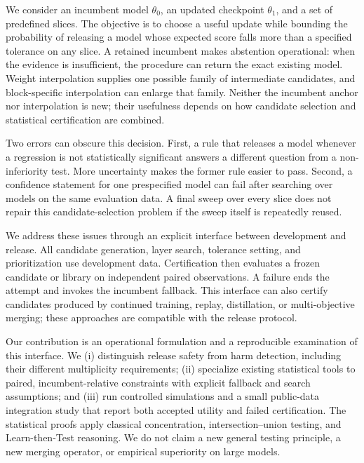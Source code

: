 \documentclass[11pt,letterpaper]{article}
\newcommand{\old}{\theta_0}
\newcommand{\new}{\theta_1}
\begin{document}
We consider an incumbent model $\old$, an updated checkpoint $\new$, and a set of predefined slices. The objective is to choose a useful update while bounding the probability of releasing a model whose expected score falls more than a specified tolerance on any slice. A retained incumbent makes abstention operational: when the evidence is insufficient, the procedure can return the exact existing model. Weight interpolation supplies one possible family of intermediate candidates, and block-specific interpolation can enlarge that family. Neither the incumbent anchor nor interpolation is new; their usefulness depends on how candidate selection and statistical certification are combined.

Two errors can obscure this decision. First, a rule that releases a model whenever a regression is not statistically significant answers a different question from a non-inferiority test. More uncertainty makes the former rule easier to pass. Second, a confidence statement for one prespecified model can fail after searching over models on the same evaluation data. A final sweep over every slice does not repair this candidate-selection problem if the sweep itself is repeatedly reused.

We address these issues through an explicit interface between development and release. All candidate generation, layer search, tolerance setting, and prioritization use development data. Certification then evaluates a frozen candidate or library on independent paired observations. A failure ends the attempt and invokes the incumbent fallback. This interface can also certify candidates produced by continued training, replay, distillation, or multi-objective merging; these approaches are compatible with the release protocol.

Our contribution is an operational formulation and a reproducible examination of this interface. We (i) distinguish release safety from harm detection, including their different multiplicity requirements; (ii) specialize existing statistical tools to paired, incumbent-relative constraints with explicit fallback and search assumptions; and (iii) run controlled simulations and a small public-data integration study that report both accepted utility and failed certification. The statistical proofs apply classical concentration, intersection--union testing, and Learn-then-Test reasoning. We do not claim a new general testing principle, a new merging operator, or empirical superiority on large models.
\end{document}
